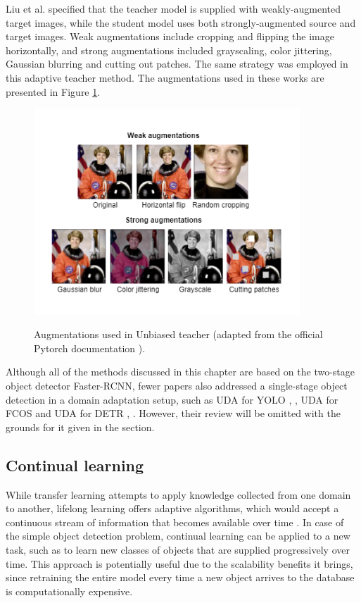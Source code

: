 Liu et al. \cite{Liu2021} specified that the teacher model is supplied with weakly-augmented target images, while the student model uses both strongly-augmented source and target images. Weak augmentations include cropping and flipping the image horizontally, and strong augmentations included grayscaling, color jittering, Gaussian blurring and cutting out patches. The same strategy was employed in this adaptive teacher method. The augmentations used in these works  \cite{Li2021, Liu2021} are presented in Figure \ref{augmentations}. 
\begin{figure}[htb]
	\begin{center}
		\includegraphics[width=10cm]{./augmentations.png}
	\end{center}
	\caption{Augmentations used in Unbiased teacher (adapted from the official Pytorch documentation \cite{pytorch}).}
	\begin{center}
		\label{augmentations}
	\end{center}
\end{figure}


Although all of the methods discussed in this chapter are based on the two-stage object detector Faster-RCNN, fewer papers also addressed a single-stage object detection in a domain adaptation setup, such as UDA for YOLO \cite{Hnewa2021}, \cite{Zhang2021a}, UDA for FCOS \cite{fcos1} and UDA for DETR \cite{Zhang2021b}, \cite{Vidit2021}. However, their review will be omitted with the grounds for it given in the  section. 

\subsection{Continual learning}
\label{cont_learning} 
While transfer learning attempts to apply knowledge collected from one domain to another, lifelong learning offers adaptive algorithms, which  would accept a continuous stream of information that becomes available over time \cite{Parisi2018}. In case of the simple object detection problem, continual learning can be applied to a new task, such as to learn new classes of objects that are supplied progressively over time. This approach is potentially useful due to the scalability benefits it brings, since retraining the entire model every time a new object arrives to the database is computationally expensive. 

